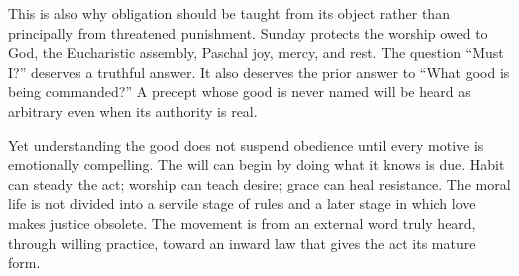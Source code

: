 This is also why obligation should be taught from its object rather than principally from threatened punishment. Sunday protects the worship owed to God, the Eucharistic assembly, Paschal joy, mercy, and rest. The question ``Must I?'' deserves a truthful answer. It also deserves the prior answer to ``What good is being commanded?'' A precept whose good is never named will be heard as arbitrary even when its authority is real.

Yet understanding the good does not suspend obedience until every motive is emotionally compelling. The will can begin by doing what it knows is due. Habit can steady the act; worship can teach desire; grace can heal resistance. The moral life is not divided into a servile stage of rules and a later stage in which love makes justice obsolete. The movement is from an external word truly heard, through willing practice, toward an inward law that gives the act its mature form.
